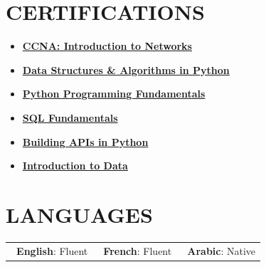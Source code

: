 \documentclass[10pt, letterpaper]{article}
\let\hrefWithoutArrow\href
\renewcommand{\href}[2]{\hrefWithoutArrow{#1}{\ifthenelse{\equal{#2}{}}{ }{#2 }\raisebox{.15ex}{\footnotesize \faExternalLink*}}}
\begin{document}
\section{CERTIFICATIONS}
 {\fontsize{9.33pt}{12pt}\selectfont
  \vspace{-0.68cm}
  \begin{multicols}{3}
	  \begin{itemize}[leftmargin=*, itemsep=0pt, topsep=0pt, parsep=0pt, partopsep=0pt]
		  \item \textbf{\hrefWithoutArrow{https://www.credly.com/badges/2faa52b1-d971-47cc-ab5f-77deb43ce4fb/linked_in_profile}{CCNA: Introduction to Networks}}
		  \item \textbf{\hrefWithoutArrow{https://www.datacamp.com/completed/statement-of-accomplishment/course/970728f8d13f505e01db21a8cdb8cc8dfe97eaab}{Data Structures \& Algorithms in Python}}
		  \item \textbf{\hrefWithoutArrow{https://www.datacamp.com/completed/statement-of-accomplishment/track/570b6b615274514fb5a8f886083784e1d1358f3f}{Python Programming Fundamentals}}
		  \item \textbf{\hrefWithoutArrow{https://www.datacamp.com/completed/statement-of-accomplishment/track/c5c3f19c391a65a517fa15b62336e4f045759095}{SQL Fundamentals}}
		  \item \textbf{\hrefWithoutArrow{https://www.datacamp.com/completed/statement-of-accomplishment/track/6c6849dcadfca0de2a113735c04f09e94f597128}{Building APIs in Python}}
		  \item \textbf{\hrefWithoutArrow{https://www.datacamp.com/completed/statement-of-accomplishment/course/43a0c70954b7ef9c1e6ef7cba8eef86f6c93e214}{Introduction to Data}}
	  \end{itemize}
  \end{multicols}
 }
\vspace{-0.5cm}


\section{LANGUAGES}
\vspace{-0.1cm}
\begin{tabularx}{\textwidth}{X X X}
	\textbf{\textbullet~English}: Fluent & \textbf{\textbullet~French}: Fluent & \textbf{\textbullet~Arabic}: Native
\end{tabularx}
\end{document}
